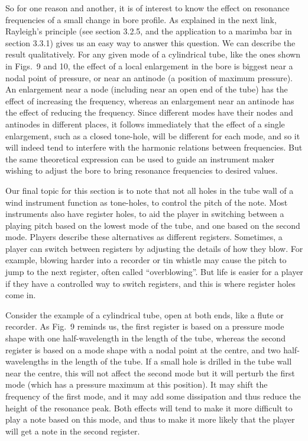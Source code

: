   So for one reason and another, it is of interest to know the effect on 
  resonance frequencies of a small change in bore profile. As explained in the 
  next link, Rayleigh’s principle (see section 3.2.5, and the application to a 
  marimba bar in section 3.3.1) gives us an easy way to answer this question. 
  We can describe the result qualitatively. For any given mode of a cylindrical 
  tube, like the ones shown in Figs.\ 9 and 10, the effect of a local 
  enlargement in the bore is biggest near a nodal point of pressure, or near an 
  antinode (a position of maximum pressure). An enlargement near a node 
  (including near an open end of the tube) has the effect of increasing the 
  frequency, whereas an enlargement near an antinode has the effect of reducing 
  the frequency. Since different modes have their nodes and antinodes in 
  different places, it follows immediately that the effect of a single 
  enlargement, such as a closed tone-hole, will be different for each mode, and 
  so it will indeed tend to interfere with the harmonic relations between 
  frequencies. But the same theoretical expression can be used to guide an 
  instrument maker wishing to adjust the bore to bring resonance frequencies to 
  desired values. 


  Our final topic for this section is to note that not all holes in the tube 
  wall of a wind instrument function as tone-holes, to control the pitch of the 
  note. Most instruments also have register holes, to aid the player in 
  switching between a playing pitch based on the lowest mode of the tube, and 
  one based on the second mode. Players describe these alternatives as 
  different registers. Sometimes, a player can switch between registers by 
  adjusting the details of how they blow. For example, blowing harder into a 
  recorder or tin whistle may cause the pitch to jump to the next register, 
  often called “overblowing”. But life is easier for a player if they have a 
  controlled way to switch registers, and this is where register holes come in. 

  Consider the example of a cylindrical tube, open at both ends, like a flute 
  or recorder. As Fig.\ 9 reminds us, the first register is based on a pressure 
  mode shape with one half-wavelength in the length of the tube, whereas the 
  second register is based on a mode shape with a nodal point at the centre, 
  and two half-wavelengths in the length of the tube. If a small hole is 
  drilled in the tube wall near the centre, this will not affect the second 
  mode but it will perturb the first mode (which has a pressure maximum at this 
  position). It may shift the frequency of the first mode, and it may add some 
  dissipation and thus reduce the height of the resonance peak. Both effects 
  will tend to make it more difficult to play a note based on this mode, and 
  thus to make it more likely that the player will get a note in the second 
  register. 

